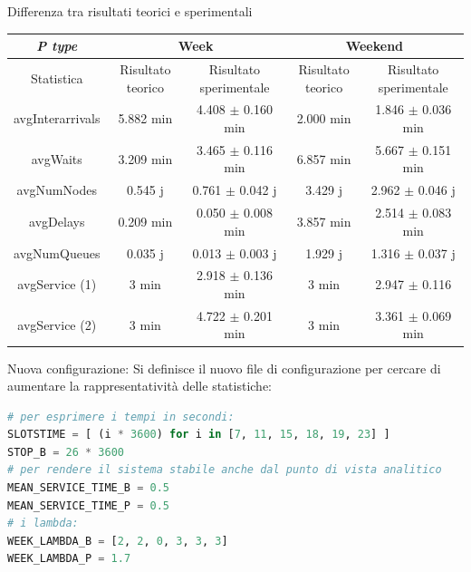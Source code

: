 \documentclass[xcolor=table]{beamer}
\newcommand{\key}[1]{\texttt{\StrSubstitute{#1}{_}{\_}}}
\begin{document}
\begin{frame}{Differenza tra risultati teorici e sperimentali}
\begin{adjustbox}{scale=0.6}
\centering
\begin{tabular}{ |c|c|c|c|c| }
\hline
\cellcolor{cellcolor} \textit{P type} & \multicolumn{2}{c|}{\cellcolor{cellcolor}Week} & \multicolumn{2}{c|}{\cellcolor{cellcolor}Weekend} \\
\hline
\cellcolor{cellcolor}Statistica & \cellcolor{cellcolor}Risultato teorico & \cellcolor{cellcolor}Risultato sperimentale & \cellcolor{cellcolor}Risultato teorico & \cellcolor{cellcolor}Risultato sperimentale \\
\hline
\hline
avgInterarrivals & 5.882 min & 4.408 $\pm$ 0.160 min & 2.000 min & 1.846 $\pm$ 0.036 min \\
\hline
avgWaits & 3.209 min & 3.465 $\pm$ 0.116 min &  6.857 min & 5.667 $\pm$ 0.151 min \\
\hline
avgNumNodes & 0.545 j & 0.761 $\pm$ 0.042 j & 3.429 j & 2.962 $\pm$ 0.046 j \\
\hline
avgDelays & 0.209 min & 0.050 $\pm$ 0.008 min & 3.857 min & 2.514 $\pm$ 0.083 min \\
\hline
avgNumQueues & 0.035 j & 0.013 $\pm$ 0.003 j & 1.929 j & 1.316 $\pm$ 0.037 j \\
\hline
avgService (1) & 3 min & 2.918 $\pm$ 0.136 min & 3 min & 2.947 $\pm$ 0.116 \\
\hline
avgService (2) & 3 min & 4.722 $\pm$ 0.201 min & 3 min & 3.361 $\pm$ 0.069 min \\
\hline

\end{tabular}
\end{adjustbox}


\end{frame}

\begin{frame}[fragile]{Nuova configurazione: \key{verify1.py}}\justifying
Si definisce il nuovo file di configurazione per cercare di aumentare la rappresentatività delle statistiche:
\begin{lstlisting}[language=Python, numbers=none, title=\key{configurations/verify1.py}]
# per esprimere i tempi in secondi:
SLOTSTIME = [ (i * 3600) for i in [7, 11, 15, 18, 19, 23] ] 
STOP_B = 26 * 3600   
# per rendere il sistema stabile anche dal punto di vista analitico
MEAN_SERVICE_TIME_B = 0.5
MEAN_SERVICE_TIME_P = 0.5
# i lambda:
WEEK_LAMBDA_B = [2, 2, 0, 3, 3, 3]
WEEK_LAMBDA_P = 1.7
\end{lstlisting}
\end{frame}
\end{document}
